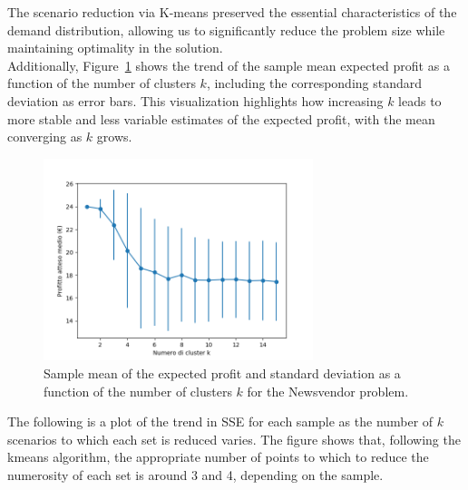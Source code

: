 \documentclass[a4paper,12pt]{article}
\begin{document}
	
	
	
	The scenario reduction via K-means preserved the essential characteristics of the demand distribution, allowing us to significantly reduce the problem size while maintaining optimality in the solution.	\\
	
	\noindent
	Additionally, Figure~\ref{fig:rendimentoK-ato} shows the trend of the sample mean expected profit as a function of the number of clusters $k$, including the corresponding standard deviation as error bars. This visualization highlights how increasing $k$ leads to more stable and less variable estimates of the expected profit, with the mean converging as $k$ grows.
	
	\begin{figure}[H]
		\centering
		\includegraphics[width=0.7\textwidth]{../immagini/rendimentoK_ato.png}
		\caption{Sample mean of the expected profit and standard deviation as a function of the number of clusters $k$ for the Newsvendor problem.}
		\label{fig:rendimentoK-ato}
	\end{figure}
	
	\noindent The following is a plot of the trend in SSE for each sample as the number of $k$ scenarios to which each set is reduced varies. The figure shows that, following the kmeans algorithm, the appropriate number of points to which to reduce the numerosity of each set is around 3 and 4, depending on the sample.
	
\end{document}
